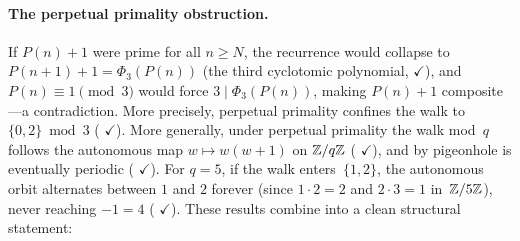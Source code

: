 \paragraph{The perpetual primality obstruction.}
If $P(n){+}1$ were prime for all $n \geq N$, the recurrence
would collapse to $P(n{+}1)+1 = \Phi_3(P(n))$ (the third cyclotomic
polynomial,
{\color{leanink}$\checkmark$}),
and $P(n) \equiv 1 \pmod{3}$ would force $3 \mid \Phi_3(P(n))$,
making $P(n){+}1$ composite---a contradiction.  More precisely,
perpetual primality confines the walk to $\{0,2\} \bmod 3$
(
{\color{leanink}$\checkmark$}).
More generally, under perpetual primality the walk mod~$q$ follows
the autonomous map $w \mapsto w(w{+}1)$ on $\mathbb{Z}/q\mathbb{Z}$
(
{\color{leanink}$\checkmark$}),
and by pigeonhole is eventually periodic
(
{\color{leanink}$\checkmark$}).
For $q = 5$, if the walk enters~$\{1,2\}$, the autonomous orbit
alternates between $1$ and $2$ forever (since $1 \cdot 2 = 2$ and
$2 \cdot 3 = 1$ in~$\mathbb{Z}/5\mathbb{Z}$), never reaching $-1 = 4$
(
{\color{leanink}$\checkmark$}).
These results combine into a clean structural statement:

